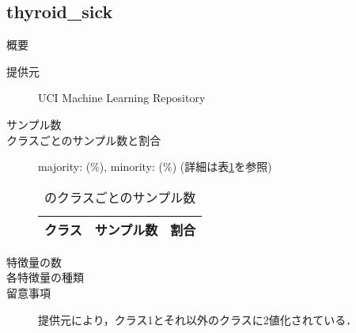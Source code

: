 \subsection{thyroid\_sick}
\begin{description}
    \item[概要] \cite{}
    \item[提供元] UCI Machine Learning Repository
    \item[サンプル数] 
    \item[クラスごとのサンプル数と割合] majority:  (\%), minority:  (\%) (詳細は表\ref{tab:}を参照)

        \begin{table}[htbp]
            \centering
            \caption{のクラスごとのサンプル数}
            \label{tab:}
            \begin{tabular}{lrc} \hline
                \multicolumn{1}{c}{クラス}&
                \multicolumn{1}{c}{サンプル数}&
                \multicolumn{1}{c}{割合}\\
                \hline
                \hline

                \hline
            \end{tabular}
        \end{table}

    \item[特徴量の数] 
    \item[各特徴量の種類] \mbox{}
        
    \item[留意事項] 提供元により，クラス1とそれ以外のクラスに2値化されている．
\end{description}

